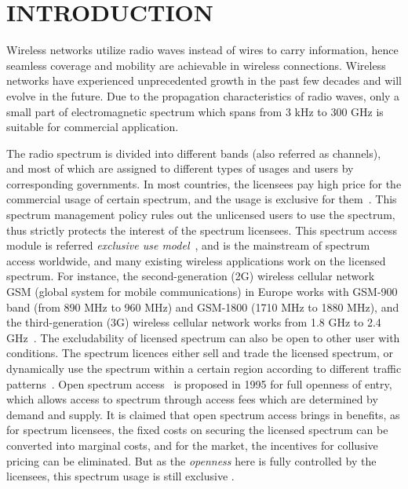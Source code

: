 \chapter{INTRODUCTION}
\label{INTRODUCTION}
Wireless networks utilize radio waves instead of wires to carry information, hence seamless coverage and mobility are achievable in wireless connections.
Wireless networks have experienced unprecedented growth in the past few decades and will evolve in the future.
Due to the propagation characteristics of radio waves, only a small part of electromagnetic spectrum which spans from 3 kHz to 300 GHz is suitable for commercial application.
 
The radio spectrum is divided into different bands (also referred as channels), and most of which are assigned to different types of usages and users by corresponding governments.
In most countries, the licensees pay high price for the commercial usage of certain spectrum, and the usage is exclusive for them~\cite{Spectrum_Management07}.
This spectrum management policy rules out the unlicensed users to use the spectrum, thus strictly protects the interest of the spectrum licensees.
This spectrum access module is referred \textit{exclusive use model}~\cite{zhao_survey_DSA_2007}, and is the mainstream of spectrum access worldwide, and many existing wireless applications work on the licensed spectrum.
For instance, the second-generation (2G) wireless cellular network GSM (global system for mobile communications) in Europe works with GSM-900 band (from 890 MHz to 960 MHz) and GSM-1800 (1710 MHz to 1880 MHz), and the third-generation (3G) wireless cellular network works from 1.8 GHz to 2.4 GHz~\cite{wireless_communicatioins2001}.
The excludability of licensed spectrum can also be open to other user with conditions.
The spectrum licences either sell and trade the licensed spectrum, or dynamically use the spectrum within a certain region according to different traffic patterns~\cite{dsa_traffic_2000}.
Open spectrum access~\cite{osa_Noam_1995} is proposed in 1995 for full openness of entry, which allows access to spectrum through access fees which are determined by demand and supply.
It is claimed that open spectrum access brings in benefits, as for spectrum licensees, the fixed costs on securing the licensed spectrum can be converted into marginal costs, and for the market, the incentives for collusive pricing can be eliminated.
But as the \textit{openness} here is fully controlled by the licensees, this spectrum usage is still exclusive .

